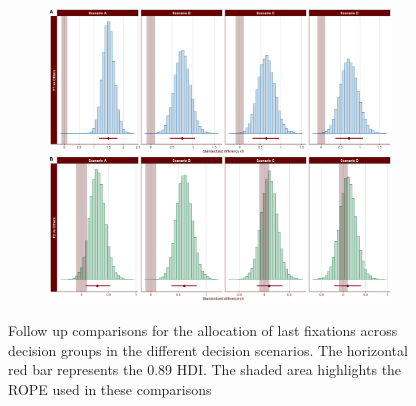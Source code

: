 \begin{appendix}
\begin{figure}[!b]
    \centering
    \begin{subfigure}{1\textwidth}
        \includegraphics[width=\linewidth]{Figures/SE2_last_scenario_comparisons_A.png}
        \label{fig:last-scenario-comparisons-A}
    \end{subfigure}
    \caption[]{Follow up comparisons for the allocation of last fixations across decision groups in the different decision scenarios. The horizontal red bar represents the 0.89 HDI. The shaded area highlights the ROPE used in these comparisons}
\end{figure}

\medskip


\end{appendix}
